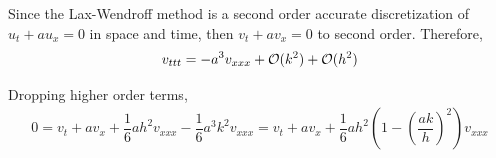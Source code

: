 \documentclass[10pt]{article}
\begin{document}
\begin{solution}[Solution]
Since the Lax-Wendroff method is a second order accurate discretization of \( u_t + au_x = 0 \) in space and time, then \( v_t + av_x = 0 \) to second order. Therefore,
\begin{align*}
    v_{ttt} = -a^3 v_{xxx} + \mathcal{O}(k^2) + \mathcal{O}(h^2)
\end{align*}

Dropping higher order terms,
\begin{align*}
    0 = v_t + av_x + \dfrac{1}{6} ah^2 v_{xxx} - \dfrac{1}{6}a^3k^2 v_{xxx}
    = v_t + a v_x + \dfrac{1}{6}ah^2 \left( 1 - \left( \dfrac{ak}{h}  \right)^2 \right) v_{xxx}
\end{align*}

\end{solution}
\end{document}

